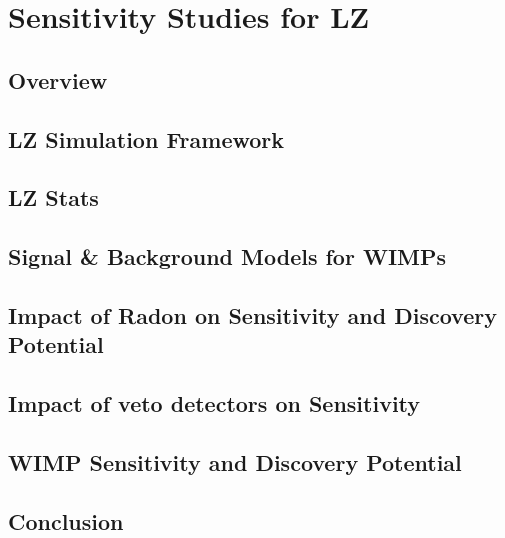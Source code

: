 \chapter{Sensitivity Studies for LZ}
\label{chap:chap5}

\section{Overview}

\section{LZ Simulation Framework}
\label{sec:radon}

\section{LZ Stats}
\label{sec:uclradonsystem}

\section{Signal \& Background Models for WIMPs}
\label{sec:uclradon}

\section{Impact of Radon on Sensitivity and Discovery Potential}
\label{sec:otherradon}

\section{Impact of veto detectors on Sensitivity}
\label{sec:lzradon}

\section{WIMP Sensitivity and Discovery Potential}
\label{sec:lzradon}

\section{Conclusion}